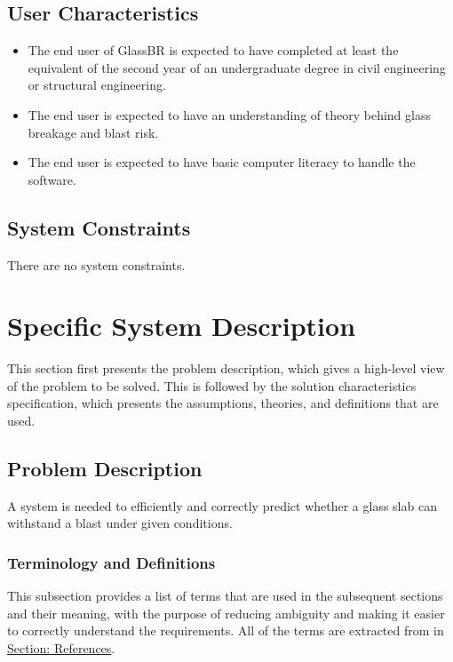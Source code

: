 \documentclass[12pt]{article}
\begin{document}
\subsection{User Characteristics}
\label{Sec:UserChars}
\begin{itemize}
\item{The end user of GlassBR is expected to have completed at least the equivalent of the second year of an undergraduate degree in civil engineering or structural engineering.}
\item{The end user is expected to have an understanding of theory behind glass breakage and blast risk.}
\item{The end user is expected to have basic computer literacy to handle the software.}
\end{itemize}
\subsection{System Constraints}
\label{Sec:SysConstraints}
There are no system constraints.

\section{Specific System Description}
\label{Sec:SpecSystDesc}
This section first presents the problem description, which gives a high-level view of the problem to be solved. This is followed by the solution characteristics specification, which presents the assumptions, theories, and definitions that are used.

\subsection{Problem Description}
\label{Sec:ProbDesc}
A system is needed to efficiently and correctly predict whether a glass slab can withstand a blast under given conditions.

\subsubsection{Terminology and Definitions}
\label{Sec:TermDefs}
This subsection provides a list of terms that are used in the subsequent sections and their meaning, with the purpose of reducing ambiguity and making it easier to correctly understand the requirements. All of the terms are extracted from \cite{astm2009} in \hyperref[Sec:References]{Section: References}.
\end{document}
